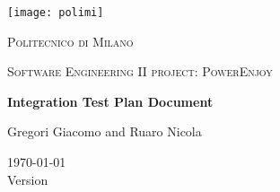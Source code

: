 \centering
\texttt{[image: polimi]}\\\vspace{0.25cm}
{\scshape\LARGE Politecnico di Milano\par}\vspace{0.25cm}
{\scshape\Large Software Engineering II project: PowerEnjoy\par}\vspace{1.5cm}
{\huge\bfseries Integration Test Plan Document \par}\vspace{1cm}
{\large Gregori Giacomo and Ruaro Nicola\par}\vfill

{\large \today \\Version \version}
